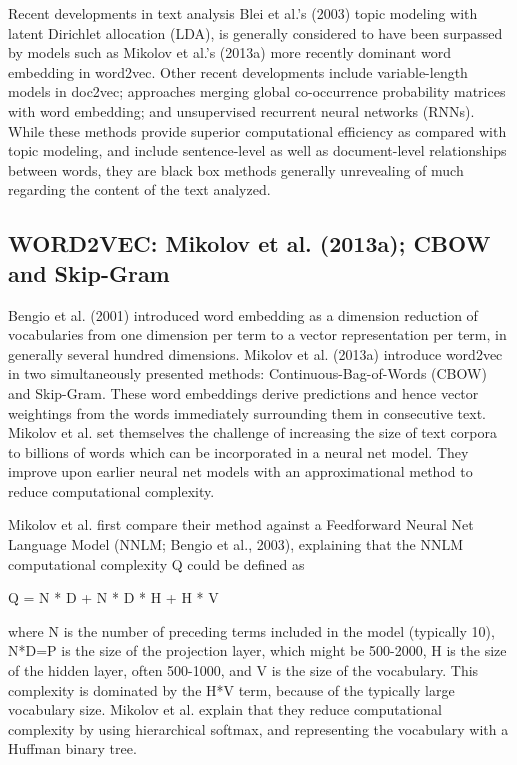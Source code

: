 \documentclass[11pt]{article}
\begin{document}
\begin{section}{Recent developments in text analysis }
Blei et al.'s (2003) topic modeling with latent Dirichlet allocation (LDA), is generally considered to have been surpassed by models such as Mikolov et al.'s (2013a) more recently dominant word embedding in word2vec. Other recent developments include variable-length models in doc2vec; approaches merging global co-occurrence probability matrices with word embedding; and unsupervised recurrent neural networks (RNNs). While these methods provide superior computational efficiency as compared with topic modeling, and include sentence-level as well as document-level relationships between words, they are black box methods generally unrevealing of much regarding the content of the text analyzed. 


\subsection{WORD2VEC: Mikolov et al. (2013a); CBOW and Skip-Gram}
Bengio et al. (2001) introduced word embedding as a dimension reduction of vocabularies from one dimension per term to a vector representation per term, in generally several hundred dimensions. Mikolov et al. (2013a) introduce word2vec in two simultaneously presented methods: Continuous-Bag-of-Words (CBOW) and Skip-Gram. These word embeddings derive predictions and hence vector weightings from the words immediately surrounding them in consecutive text. Mikolov et al. set themselves the challenge of increasing the size of text corpora to billions of words which can be incorporated in a neural net model. They improve upon earlier neural net models with an approximational method to reduce computational complexity.

Mikolov et al. first compare their method against a Feedforward Neural Net Language Model (NNLM; Bengio et al., 2003), explaining that the NNLM computational complexity Q could be defined as
\begin{center}
Q = N * D + N * D * H + H * V
\end{center}
where N is the number of preceding terms included in the model (typically 10), N*D=P is the size of the projection layer, which might be 500-2000, H is the size of the hidden layer, often 500-1000, and V is the size of the vocabulary. This complexity is dominated by the H*V term, because of the typically large vocabulary size. Mikolov et al. explain that they reduce computational complexity by using hierarchical softmax, and representing the vocabulary with a Huffman binary tree.


\end{section}
\end{document}
